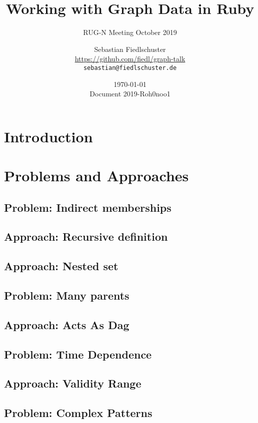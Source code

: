 \documentclass[green, 12pt]{beamer}
\title{Working with Graph Data in Ruby}
\subtitle{RUG-N Meeting October 2019}
\date{\today \\ \vspace*{2mm} \tiny{Document 2019-Roh0noo1} \normalsize}
\author[Sebastian Fiedlschuster]{Sebastian Fiedlschuster \\ \small{\url{https://github.com/fiedl/graph-talk}} \\ \small\texttt{sebastian@fiedlschuster.de}}
\begin{document}



\section{Introduction}


\section{Problems and Approaches}
\subsection{Problem: Indirect memberships}

\subsection{Approach: Recursive definition}

\subsection{Approach: Nested set}

\subsection{Problem: Many parents}

\subsection{Approach: Acts As Dag}

\subsection{Problem: Time Dependence}

\subsection{Approach: Validity Range}

\subsection{Problem: Complex Patterns}

\end{document}
